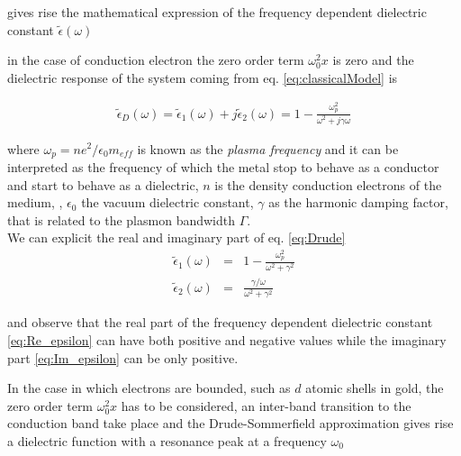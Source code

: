 gives rise the mathematical expression of the frequency dependent dielectric constant $\widetilde{\epsilon}(\omega)$


in the case of conduction electron the zero order term $\omega_0^2 x$ is zero and the dielectric response of the system coming from eq. \ref{eq:classicalModel} is 




\begin{eqnarray}\label{eq:Drude}
	\widetilde{\epsilon}_D \left(\omega\right) = \widetilde{\epsilon}_1(\omega) + j\widetilde{\epsilon}_2(\omega) = 1 - \frac{\omega_p^2}{\omega^2 + j\gamma\omega}
\end{eqnarray}

where $\omega_p = ne^2/\epsilon_0m_{eff}$ is known as the \emph{plasma frequency} and it can be interpreted as the frequency of which the metal stop to behave as a conductor and start to behave as a dielectric, $n$ is the density conduction electrons of the medium, , $\epsilon_0$ the vacuum dielectric constant, $\gamma$ as the harmonic damping factor, that is related to the plasmon bandwidth $\Gamma$.\\

We can explicit the real and imaginary part of eq. \ref{eq:Drude}
\begin{eqnarray}
	\widetilde{\epsilon}_1(\omega) & = & 1 - \frac{\omega_p^2}{\omega^2 + \gamma^2} \\ \label{eq:Re_epsilon}
	\widetilde{\epsilon}_2(\omega) & = & \frac{\gamma/\omega}{\omega^2 + \gamma^2} \label{eq:Im_epsilon}
\end{eqnarray}

and observe that the real part of the frequency dependent dielectric constant \ref{eq:Re_epsilon} can have both positive  and negative values while the imaginary part \ref{eq:Im_epsilon} can be only positive.


In the case in which electrons are bounded, such as $d$ atomic shells in gold, the zero order term $\omega_0^2 x$ has to be considered, an inter-band transition to the conduction band take place and the Drude-Sommerfield approximation gives rise a dielectric function with a resonance peak at a frequency $\omega_0$

